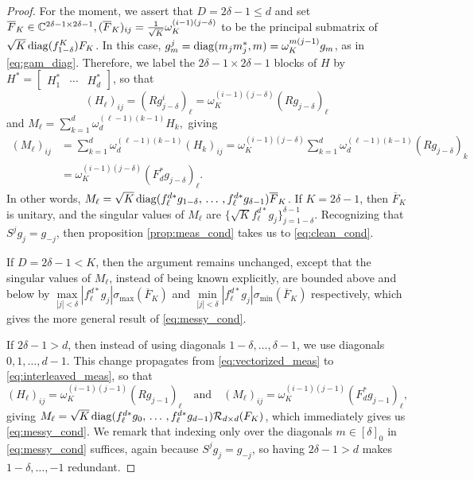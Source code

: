 \begin{proof}
  For the moment, we assert that $D = 2 \delta - 1 \le d$ and set $\overline{F}_K \in \mathbb{C}^{2 \delta - 1 \times 2 \delta - 1}, (\overline{F}_K)_{ij} = \frac{1}{\sqrt{K}}\omega_K^{(i-1)(j-\delta)}$ to be the principal submatrix of $\sqrt{K} \operatorname{diag}(f^K_{1 - \delta}) F_K$.  In this case, $g_m^j = \operatorname{diag}(m_j m_j^*, m) = \omega_K^{m(j - 1)} g_m$, as in \eqref{eq:gam_diag}.  Therefore, we label the $2 \delta - 1 \times 2 \delta - 1$ blocks of $H$ by $H^* = \begin{bmatrix} H_1^* & \cdots & H_d^* \end{bmatrix}$, so that \[(H_\ell)_{ij} = (R g_{j - \delta}^i)_\ell = \omega_K^{(i - 1)(j - \delta)}(R g_{j - \delta})_\ell\] and $M_\ell = \sum_{k = 1}^d \omega_d^{(\ell - 1)(k - 1)} H_k,$ giving \begin{align*} (M_\ell)_{ij} &= \sum_{k = 1}^d \omega_d^{(\ell - 1)(k - 1)} (H_k)_{ij} = \omega_K^{(i - 1)(j - \delta)} \sum_{k = 1}^d \omega_d^{(\ell - 1)(k - 1)} (Rg_{j - \delta})_k \\ &= \omega_K^{(i - 1)(j - \delta)} (F_d^* g_{j - \delta})_\ell. \end{align*}  In other words, $M_\ell = \sqrt{K} \operatorname{diag}(f_\ell^{d*} g_{1 - \delta},\, \ldots\, , f_\ell^{d*} g_{\delta - 1}) \overline{F}_K$.  If $K = 2 \delta - 1$, then $\overline{F}_K$ is unitary, and the singular values of $M_\ell$ are $\{\sqrt{K} f_\ell^{d *} g_j\}_{j = 1 - \delta}^{\delta - 1}$.  Recognizing that $S^j g_j = g_{-j}$, then proposition \ref{prop:meas_cond} takes us to \eqref{eq:clean_cond}.

  If $D = 2 \delta - 1 < K$, then the argument remains unchanged, except that the singular values of $M_\ell$, instead of being known explicitly, are bounded above and below by $\max\limits_{|j| < \delta} |f_\ell^{d *} g_j| \sigma_{\max}(\overline{F}_K)$ and $\min\limits_{|j| < \delta} |f_\ell^{d *} g_j| \sigma_{\min}(\overline{F}_K)$ respectively, which gives the more general result of \eqref{eq:messy_cond}.

  If $2 \delta - 1 > d$, then instead of using diagonals $1 - \delta, \ldots, \delta - 1$, we use diagonals $0, 1, \ldots, d - 1$.  This change propagates from \eqref{eq:vectorized_meas} to \eqref{eq:interleaved_meas}, so that \[(H_\ell)_{ij} = \omega_K^{(i - 1)(j - 1)} (R g_{j - 1})_\ell \quad \text{and} \quad (M_\ell)_{ij} = \omega_K^{(i - 1)(j - 1)} (F_d^* g_{j - 1})_\ell,\] giving $M_\ell = \sqrt{K} \operatorname{diag}(f_\ell^{d*} g_0,\, \ldots\, , f_\ell^{d*} g_{d - 1})\mathcal{R}_{d \times d}(F_K)$, which immediately gives us \eqref{eq:messy_cond}.  We remark that indexing only over the diagonals $m \in [\delta]_0$ in \eqref{eq:messy_cond} suffices, again because $S^j g_j = g_{-j}$, so having $2 \delta - 1 > d$ makes $1 - \delta, \ldots, -1$ redundant.
  
\end{proof}
